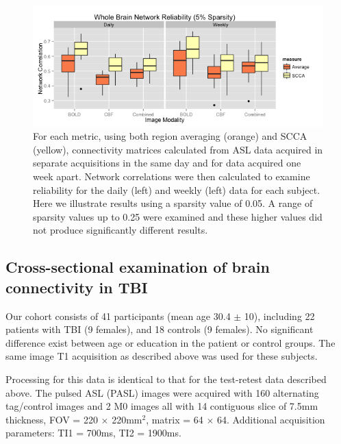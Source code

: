\documentclass{llncs}
\begin{document}
\begin{figure}[tb]
\begin{center}
\includegraphics[width=0.9\linewidth]{retest.png} 
\caption{For each metric, using both region averaging (orange) and SCCA (yellow), connectivity matrices calculated from ASL data acquired in separate acquisitions in the same day and for data acquired one week apart. Network correlations were then calculated to examine reliability for the daily (left) and weekly (left) data for each subject. Here we illustrate results using a sparsity value of 0.05. A range of sparsity values up to 0.25 were examined and these higher values did not produce significantly different results.}
\label{fig:testretest}
\end{center}
\end{figure}

\subsection{Cross-sectional examination of brain connectivity in TBI}
 Our cohort consists of 41 participants (mean age 30.4 $\pm$ 10), including 22 patients with TBI (9 females), and 18 controls (9 females). No significant difference exist between age or education in the patient or control groups.  The same image T1 acquisition as described above was used for these subjects.

 Processing for this data is identical to that for the test-retest data described above. The pulsed ASL (PASL) images were acquired with 160 alternating tag/control images and 2 M0 images all with 14 contiguous slice of 7.5mm thickness, FOV = 220 $\times$ 220mm$^2$, matrix = 64 $\times$ 64. Additional acquisition parameters: TI1 = 700ms, TI2 = 1900ms.
\end{document}
